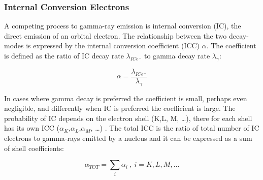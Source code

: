 \subsubsection{Internal Conversion Electrons}
A competing process to gamma-ray emission is internal conversion (IC), the direct emission of an orbital electron. The relationship between the two decay-modes is expressed by the internal conversion coefficient (ICC) $\alpha$. The coefficient is defined as the ratio of IC decay rate $\lambda_{ICe^-}$ to gamma decay rate $\lambda_{\gamma}$:

\begin{equation}
    \alpha =  \frac{\lambda_{ICe^-}}{\lambda_{\gamma}}
\end{equation}

In cases where gamma decay is preferred the coefficient is small, perhaps even negligible, and differently when IC is preferred the coefficient is large. The probability of IC depends on the electron shell (K,L, M, …), there for each shell has its own ICC ($\alpha_K$,$\alpha_L$,$\alpha_M$, …) .
The total ICC is the ratio of total number of IC electrons to gamma-rays emitted by a nucleus and it can be expressed as a sum of shell coefficients:

\begin{equation}
    \alpha_{TOT} =  \sum_i \alpha_i \ , \ i = K, L, M, ...
\end{equation}

